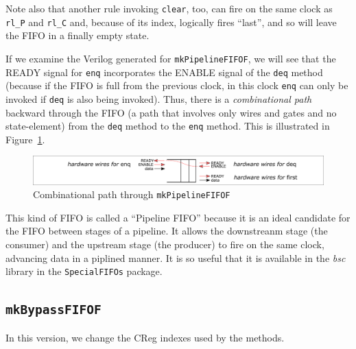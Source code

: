 Note also that another rule invoking \verb|clear|, too, can fire on
the same clock as \verb|rl_P| and \verb|rl_C| and, because of its
index, logically fires ``last'', and so will leave the FIFO in a
finally empty state.

If we examine the Verilog generated for \verb|mkPipelineFIFOF|, we
will see that the READY signal for \verb|enq| incorporates the ENABLE
signal of the \verb|deq| method (because if the FIFO is full from the
previous clock, in this clock \verb|enq| can only be invoked if
\verb|deq| is also being invoked).  Thus, there is a
\emph{combinational path} backward through the FIFO (a path that
involves only wires and gates and no state-element) from the
\verb|deq| method to the \verb|enq| method.  This is illustrated in
Figure~\ref{Fig_Combo_path_in_mkPipelineFIFOF}.
\begin{figure}[htbp]
  \centerline{\includegraphics[width=6in,angle=0]{Figures/Fig_Combo_path_in_mkPipelineFIFOF}}
  \caption{\label{Fig_Combo_path_in_mkPipelineFIFOF}
           Combinational path through {\tt mkPipelineFIFOF}}
\end{figure}

This kind of FIFO is called a ``Pipeline FIFO'' because it is an ideal
candidate for the FIFO between stages of a pipeline.  It allows the
downstreanm stage (the consumer) and the upstream stage (the producer)
to fire on the same clock, advancing data in a piplined manner.  It is
so useful that it is available in the \emph{bsc} library in the
\verb|SpecialFIFOs| package.




\subsection{{\tt mkBypassFIFOF}}

\label{Sec_mkBypassFIFOF}

In this version, we change the CReg indexes used by the methods.

